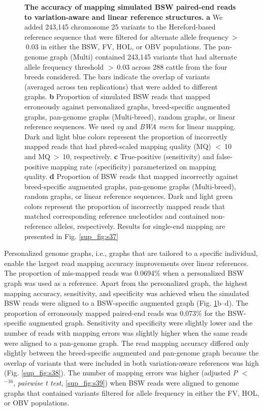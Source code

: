 \documentclass[../main.tex]{subfiles}
\begin{document}
\begin{figure}[!htb]
    \centering
    \caption[Read mapping across cattle graphs combination]{\textbf{The accuracy of mapping simulated BSW paired-end reads to variation-aware and linear reference structures.}\small{ \textbf{a} We added 243,145 chromosome 25 variants to the Hereford-based reference sequence that were filtered for alternate allele frequency $>$ 0.03 in either the BSW, FV, HOL, or OBV populations. The pan-genome graph (Multi) contained 243,145 variants that had alternate allele frequency threshold $>$ 0.03 across 288 cattle from the four breeds considered. The bars indicate the overlap of variants (averaged across ten replications) that were added to different graphs. \textbf{b} Proportion of simulated BSW reads that mapped erroneously against personalized graphs, breed-specific augmented graphs, pan-genome graphs (Multi-breed), random graphs, or linear reference sequences. We used \emph{vg} and \emph{BWA mem} for linear mapping. Dark and light blue colors represent the proportion of incorrectly mapped reads that had phred-scaled mapping quality (MQ) $<$ 10 and MQ $>$ 10, respectively. \textbf{c} True-positive (sensitivity) and false-positive mapping rate (specificity) parameterized on mapping quality. \textbf{d} Proportion of BSW reads that mapped incorrectly against breed-specific augmented graphs, pan-genome graphs (Multi-breed), random graphs, or linear reference sequences. Dark and light green colors represent the proportion of incorrectly mapped reads that matched corresponding reference nucleotides and contained non-reference alleles, respectively. Results for single-end mapping are presented in Fig. \ref{sup_fig:s37}}}
    \label{fig34:breed}
\end{figure}


Personalized genome graphs, i.e., graphs that are tailored to a specific individual, enable the largest read mapping accuracy improvements over linear references. The proportion of mis-mapped reads was 0.0694\% when a personalized BSW graph was used as a reference. Apart from the personalized graph, the highest mapping accuracy, sensitivity, and specificity was achieved when the simulated BSW reads were aligned to a BSW-specific augmented graph (Fig. \ref{fig34:breed}b–d). The proportion of erroneously mapped paired-end reads was 0.073\% for the BSW-specific augmented graph. Sensitivity and specificity were slightly lower and the number of reads with mapping errors was slightly higher when the same reads were aligned to a pan-genome graph. The read mapping accuracy differed only slightly between the breed-specific augmented and pan-genome graph because the overlap of variants that were included in both variation-aware references was high (Fig. \ref{sup_fig:s38}). The number of mapping errors was higher (adjusted \emph{P} $<$ $^{−16}$, \emph{pairwise t test}, \ref{sup_fig:s39}) when BSW reads were aligned to genome graphs that contained variants filtered for allele frequency in either the FV, HOL, or OBV populations.
\end{document}
